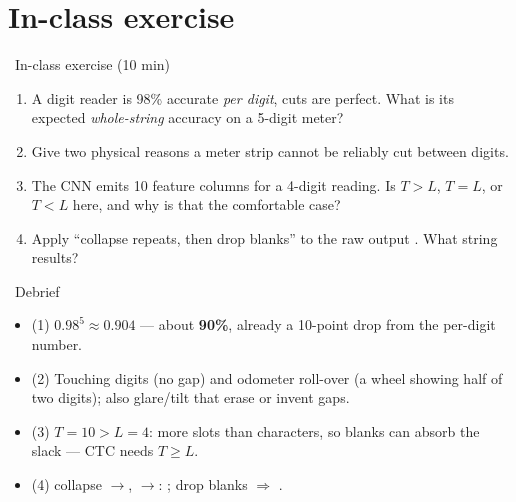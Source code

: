 \documentclass[10pt,aspectratio=169]{beamer}
\begin{document}
\section{In-class exercise}

\begin{frame}{\faPen~In-class exercise (10 min)}
  \begin{infobox}
  \end{infobox}
  \begin{enumerate}
    \item A digit reader is 98\% accurate \emph{per digit}, cuts are perfect. What is its expected
          \emph{whole-string} accuracy on a 5-digit meter?
    \item Give two physical reasons a meter strip cannot be reliably cut between digits.
    \item The CNN emits 10 feature columns for a 4-digit reading. Is $T>L$, $T=L$, or $T<L$ here,
          and why is that the comfortable case?
    \item Apply ``collapse repeats, then drop blanks'' to the raw output
          . What string results?
  \end{enumerate}
\end{frame}

\begin{frame}{\faPen~Debrief}
  \begin{itemize}
    \item (1) $0.98^{5} \approx 0.904$ --- about \textbf{90\%}, already a 10-point drop from the per-digit number.
    \item (2) Touching digits (no gap) and odometer roll-over (a wheel showing half of two digits);
          also glare/tilt that erase or invent gaps.
    \item (3) $T{=}10>L{=}4$: more slots than characters, so blanks can absorb the slack --- CTC needs $T\ge L$.
    \item (4) collapse $\to$, $\to$: ; drop blanks $\Rightarrow$ .
  \end{itemize}
\end{frame}
\end{document}
